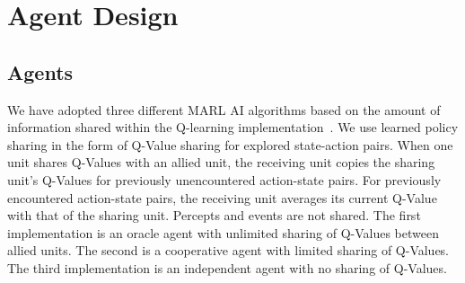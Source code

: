 \section{Agent Design} \label{AgentDesign}

\subsection{Agents}

We have adopted three different MARL AI algorithms based on the amount of information shared within the Q-learning implementation~\cite{Hu98TheoreticFramework}. We use learned policy sharing in the form of Q-Value sharing for explored state-action pairs. When one unit shares Q-Values with an allied unit, the receiving unit copies the sharing unit's Q-Values for previously unencountered action-state pairs. For previously encountered action-state pairs, the receiving unit averages its current Q-Value with that of the sharing unit. Percepts and events are not shared. The first implementation is an oracle agent with unlimited sharing of Q-Values between allied units. The second is a cooperative agent with limited sharing of Q-Values. The third implementation is an independent agent with no sharing of Q-Values. 









